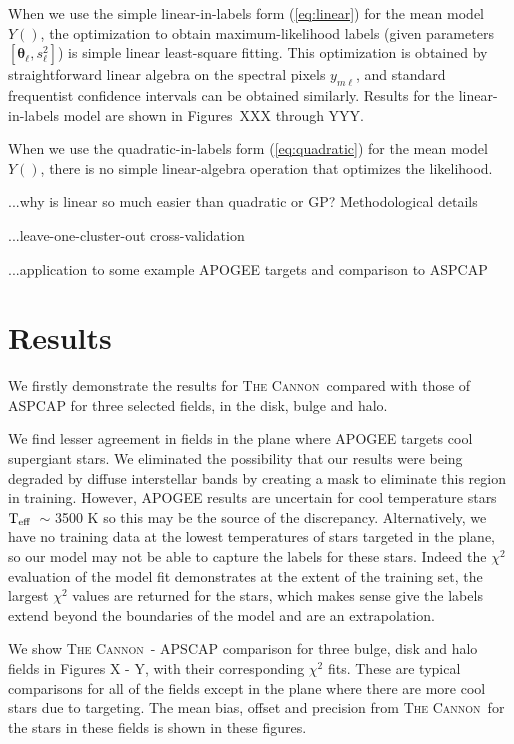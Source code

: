 \documentclass[12pt, preprint]{aastex}
\newcommand{\set}[1]{\bm{#1}}
\newcommand{\teff}{\mbox{$\rm T_{eff}$}}
\newcommand{\tc}{\textsc{The Cannon}}
\begin{document}
When we use the simple linear-in-labels form (\ref{eq:linear}) for the
mean model $Y()$, the optimization to obtain maximum-likelihood labels
(given parameters $[\set{\theta}_\ell, s_\ell^2]$) is simple linear
least-square fitting.
This optimization is obtained by straightforward linear algebra on the
spectral pixels $y_{m\ell}$, and standard frequentist confidence
intervals can be obtained similarly.
Results for the linear-in-labels model are shown in Figures~XXX through
YYY.

When we use the quadratic-in-labels form (\ref{eq:quadratic}) for the
mean model $Y()$, there is no simple linear-algebra operation that
optimizes the likelihood.



...why is linear so much easier than quadratic or GP?  Methodological details

...leave-one-cluster-out cross-validation

...application to some example APOGEE targets and comparison to ASPCAP




\section{Results}

We firstly demonstrate the results for \tc\ compared with those of ASPCAP for three selected fields, in the disk, bulge and halo. 

We find lesser agreement in fields in the plane where APOGEE targets cool supergiant stars. We eliminated the possibility that our results were being degraded by diffuse interstellar bands \citep{Ziaskowski2014} by creating a mask to eliminate this region in training. However, APOGEE results are uncertain for cool temperature stars \teff\ $\sim$ 3500 K so this may be the source of the discrepancy. Alternatively, we have no training data at the lowest temperatures of stars targeted in the plane, so our model may not be able to capture the labels for these stars. Indeed the $\chi^2$ evaluation of the model fit demonstrates at the extent of the training set, the largest $\chi^2$ values are returned for the stars, which makes sense give the labels extend beyond the boundaries of the model and are an extrapolation. 

We show \tc\ - APSCAP comparison for three bulge, disk and halo fields in Figures X - Y, with their corresponding $\chi^2$ fits. These are typical comparisons for all of the fields except in the plane where there are more cool stars due to targeting. The mean bias, offset and precision from \tc\ for the stars in these fields is shown in these figures. 
\end{document}
